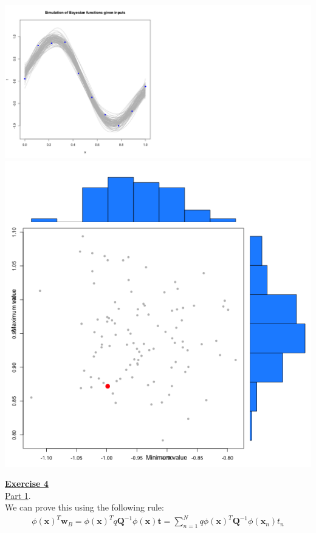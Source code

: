 \documentclass[a4paper, 11pt]{article}\usepackage[]{graphicx}\usepackage[]{color}
\begin{document}
\begin{center}
\includegraphics[scale=0.6]{ps2_plot4.png}
\includegraphics[scale=0.5]{ps2_plot5.png}
\end{center}
\newpage
\textbf{\underline{Exercise 4}}\\
\newline \underline{Part 1}. \\
\newline We can prove this using the following rule:
\begin{eqnarray}
\phi (\mathbf{x})^T \mathbf{w}_B = \phi (\mathbf{x})^T q \mathbf{Q}^{-1} \phi (\mathbf{x}) \mathbf{t} = \sum_{n=1}^{N} q \phi (\mathbf{x})^T \mathbf{Q}^{-1} \phi(\mathbf{x}_n) t_n  \nonumber
\end{eqnarray}
\end{document}
